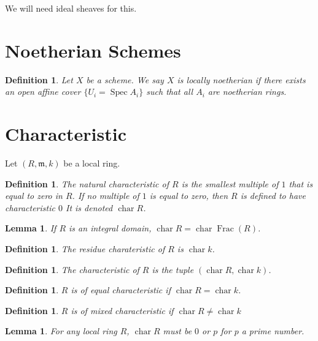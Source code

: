 \documentclass[a4paper]{article}
\newtheorem{lem}[thm]{Lemma}
\newtheorem{defn}[thm]{Definition}
\newcommand{\Spec}{\operatorname{Spec}}
\begin{document}
We will need ideal sheaves for this.

\section{Noetherian Schemes}

\begin{defn}
	Let \(X\) be a scheme. 
	We say \(X\) is \textit{locally noetherian}
	if there exists an open affine cover
	\(\{U_{i} = \Spec A_{i}\}\) such that
	all \(A_{i}\) are noetherian rings.
\end{defn}

\section{Characteristic}

\newcommand{\ch}{\operatorname{char}}
\newcommand{\Frac}{\operatorname{Frac}}


Let \((R,\mathfrak{m},k)\) be a local ring.

\begin{defn}
	The \textit{natural characteristic} of \(R\) is
	the smallest multiple of \(1\) that is equal to zero in \(R\).
	If no multiple of \(1\) is equal to zero, then \(R\) is
	defined to have characteristic \(0\)
	It is denoted \(\ch R\).
\end{defn}

\begin{lem}
	If \(R\) is an integral domain, 
	\(\ch R = \ch \Frac(R)\).
\end{lem}

\begin{defn}
	The \textit{residue charateristic} of \(R\) is
	\(\ch k\).
\end{defn}

\begin{defn}
	The \textit{characteristic} of \(R\) is the tuple
	\((\ch R, \ch k)\).
\end{defn}

\begin{defn}
	\(R\) is of \textit{equal characteristic} if
	\(\ch R = \ch k\).
\end{defn}

\begin{defn}
	\(R\) is of \textit{mixed characteristic} if
	\(\ch R \neq \ch k\)
\end{defn}

\begin{lem}
	For any local ring \(R\), \(\ch R\) must be \(0\) or \(p\) 
	for \(p\) a prime number.
\end{lem}
\end{document}

